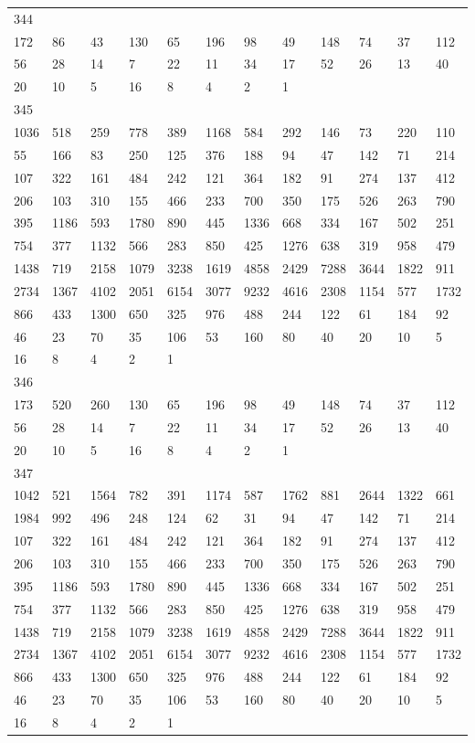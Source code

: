 \begin{longtable}{llllllllllll}
344&&&&&&&&&&&\\
172& 86& 43& 130& 65& 196& 98& 49& 148& 74& 37& 112\\
56& 28& 14& 7& 22& 11& 34& 17& 52& 26& 13& 40\\
20& 10& 5& 16& 8& 4& 2& 1& \\

345&&&&&&&&&&&\\
1036& 518& 259& 778& 389& 1168& 584& 292& 146& 73& 220& 110\\
55& 166& 83& 250& 125& 376& 188& 94& 47& 142& 71& 214\\
107& 322& 161& 484& 242& 121& 364& 182& 91& 274& 137& 412\\
206& 103& 310& 155& 466& 233& 700& 350& 175& 526& 263& 790\\
395& 1186& 593& 1780& 890& 445& 1336& 668& 334& 167& 502& 251\\
754& 377& 1132& 566& 283& 850& 425& 1276& 638& 319& 958& 479\\
1438& 719& 2158& 1079& 3238& 1619& 4858& 2429& 7288& 3644& 1822& 911\\
2734& 1367& 4102& 2051& 6154& 3077& 9232& 4616& 2308& 1154& 577& 1732\\
866& 433& 1300& 650& 325& 976& 488& 244& 122& 61& 184& 92\\
46& 23& 70& 35& 106& 53& 160& 80& 40& 20& 10& 5\\
16& 8& 4& 2& 1& \\

346&&&&&&&&&&&\\
173& 520& 260& 130& 65& 196& 98& 49& 148& 74& 37& 112\\
56& 28& 14& 7& 22& 11& 34& 17& 52& 26& 13& 40\\
20& 10& 5& 16& 8& 4& 2& 1& \\

347&&&&&&&&&&&\\
1042& 521& 1564& 782& 391& 1174& 587& 1762& 881& 2644& 1322& 661\\
1984& 992& 496& 248& 124& 62& 31& 94& 47& 142& 71& 214\\
107& 322& 161& 484& 242& 121& 364& 182& 91& 274& 137& 412\\
206& 103& 310& 155& 466& 233& 700& 350& 175& 526& 263& 790\\
395& 1186& 593& 1780& 890& 445& 1336& 668& 334& 167& 502& 251\\
754& 377& 1132& 566& 283& 850& 425& 1276& 638& 319& 958& 479\\
1438& 719& 2158& 1079& 3238& 1619& 4858& 2429& 7288& 3644& 1822& 911\\
2734& 1367& 4102& 2051& 6154& 3077& 9232& 4616& 2308& 1154& 577& 1732\\
866& 433& 1300& 650& 325& 976& 488& 244& 122& 61& 184& 92\\
46& 23& 70& 35& 106& 53& 160& 80& 40& 20& 10& 5\\
16& 8& 4& 2& 1& \\


\end{longtable}
